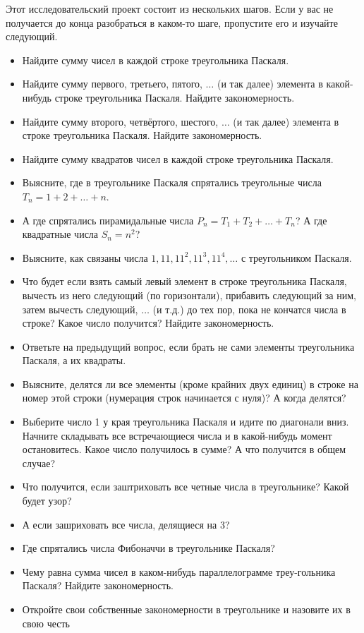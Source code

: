 
Этот исследовательский проект состоит из нескольких шагов. Если у вас не получается до конца разобраться в каком-то шаге, пропустите его и изучайте следующий.

\begin{itemize}
\item Найдите сумму чисел в каждой строке треугольника Паскаля.
\item Найдите сумму первого, третьего, пятого, $\ldots$ (и так далее) элемента в какой-нибудь строке треугольника Паскаля. Найдите закономерность.
\item Найдите сумму второго, четвёртого, шестого, $\ldots$ (и так далее) элемента в строке треугольника Паскаля. Найдите закономерность.
\item Найдите сумму квадратов чисел в каждой строке треугольника Паскаля.
\item Выясните, где в треугольнике Паскаля спрятались треугольные числа $T_n = 1+2+\ldots + n$. 
\item А где спрятались пирамидальные числа $P_n = T_1 + T_2 + \ldots + T_n$? А где квадратные числа $S_n = n^2$?
\item Выясните, как связаны числа $1, 11, 11^2, 11^3, 11^4, \ldots$ с треугольником Паскаля.
\item Что будет если взять самый левый элемент в строке треугольника Паскаля, вычесть из него следующий (по горизонтали), прибавить следующий за ним, затем вычесть следующий, $\ldots$ (и т.д.) до тех пор, пока не кончатся числа в строке? Какое число получится? Найдите закономерность.
\item Ответьте на предыдущий вопрос, если брать не сами элементы треугольника Паскаля, а их квадраты.
\item Выясните, делятся ли все элементы (кроме крайних двух единиц) в строке на номер этой строки (нумерация строк начинается с нуля)? А когда делятся? 
\item Выберите число 1 у края треугольника Паскаля и идите по диагонали вниз. Начните складывать все встречающиеся числа и в какой-нибудь момент остановитесь. Какое число получилось в сумме? А что получится в общем случае?
\item Что получится, если заштриховать все четные числа в треугольнике? Какой будет узор?
\item А если зашриховать все числа, делящиеся на 3?
\item Где спрятались числа Фибоначчи в треугольнике Паскаля?
\item Чему равна сумма чисел в каком-нибудь параллелограмме треу-\linebreak гольника Паскаля? Найдите закономерность.
\item Откройте свои собственные закономерности в треугольнике и назовите их в свою честь
\end{itemize}